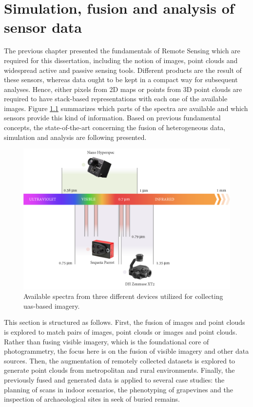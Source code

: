 \chapter{Simulation, fusion and analysis of sensor data}
\label{sec:context_rs}

The previous chapter presented the fundamentals of Remote Sensing which are required for this dissertation, including the notion of images, point clouds and widespread active and passive sensing tools. Different products are the result of these sensors, whereas data ought to be kept in a compact way for subsequent analyses. Hence, either pixels from 2D maps or points from 3D point clouds are required to have stack-based representations with each one of the available images. Figure \ref{fig:available_spectra} summarizes which parts of the spectra are available and which sensors provide this kind of information. Based on previous fundamental concepts, the state-of-the-art concerning the fusion of heterogeneous data, simulation and analysis are following presented.

\begin{figure}[ht]
	\includegraphics[width=\linewidth]{figs/context/spectra_devices.png}
	\caption{Available spectra from three different devices utilized for collecting \acrshort{uas}-based imagery. }
    \label{fig:available_spectra}
\end{figure}

This section is structured as follows. First, the fusion of images and point clouds is explored to match pairs of images, point clouds or images and point clouds. Rather than fusing visible imagery, which is the foundational core of photogrammetry, the focus here is on the fusion of visible imagery and other data sources. Then, the augmentation of remotely collected datasets is explored to generate point clouds from metropolitan and rural environments. Finally, the previously fused and generated data is applied to several case studies: the planning of scans in indoor scenarios, the phenotyping of grapevines and the inspection of archaeological sites in seek of buried remains.

